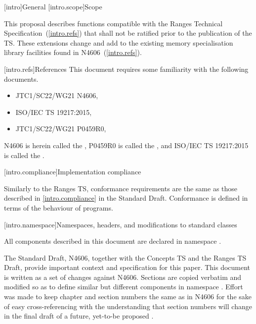 [intro]{General}
[intro.scope]{Scope}

\pnum
This proposal describes functions compatible with the Ranges Technical
Specification~(\ref{intro.refs}) that shall not be ratified prior to the
publication of the TS. These extensions change and add to the existing
memory specialisation library facilities found in N4606~(\ref{intro.refs}).

[intro.refs]{References}
This document requires some familiarity with the following documents.

\begin{itemize}
\item JTC1/SC22/WG21 N4606,   
\item ISO/IEC TS 19217:2015,  
\item JTC1/SC22/WG21 P0459R0, 
\end{itemize}

N4606 is herein called the , P0459R0 is called the ,
and ISO/IEC TS 19217:2015 is called the .

[intro.compliance]{Implementation compliance}

\pnum
Similarly to the Ranges TS, conformance requirements are the same as those described in
\ref{intro.compliance} in the \Cpp Standard Draft.
\enternote
Conformance is defined in terms of the behaviour of programs.
\exitnote

[intro.namespace]{Namespaces, headers, and modifications to standard classes}

\pnum
All components described in this document are declared in namespace .


\pnum
The \Cpp Standard Draft, N4606, together with the Concepts TS and the Ranges
TS Draft, provide important context and specification for this paper. This
document is written as a set of changes against N4606. Sections are copied
verbatim and modified so as to define similar but different components in
namespace . Effort was made to keep
chapter and section numbers the same as in N4606 for the sake of easy
cross-referencing with the understanding that section numbers will change in
the final draft of a future, yet-to-be proposed .

